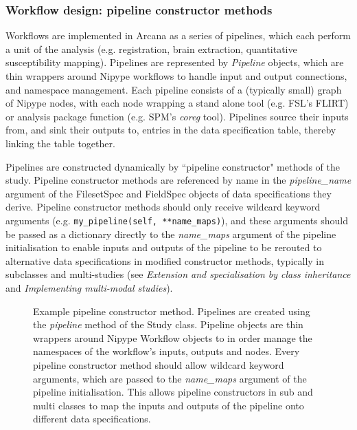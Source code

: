 \documentclass[smallextended]{svjour3}       %
\begin{document}
\subsubsection*{Workflow design: pipeline constructor methods}
\label{sec:pipeline-constructors}

Workflows are implemented in Arcana as a series of pipelines, which
each perform a unit of the analysis (e.g. registration, brain
extraction, quantitative susceptibility mapping). Pipelines are represented by \emph{Pipeline} objects,
which are thin wrappers around Nipype workflows to handle input and output
connections, and namespace management. Each pipeline consists of a
(typically small) graph of Nipype nodes, with each node wrapping a stand alone tool
(e.g. FSL's FLIRT) or analysis package function (e.g. SPM's \emph{coreg}
tool). Pipelines source their inputs from, and sink their outputs to, entries
in the data specification table, thereby linking the table together.

Pipelines are constructed dynamically by ``pipeline constructor" methods
of the study. Pipeline constructor methods are referenced by name in the \emph{pipeline\_name}
argument of the FilesetSpec and FieldSpec objects of data specifications
they derive. Pipeline constructor methods should only receive wildcard keyword
arguments (e.g. \lstinline{my_pipeline(self, **name_maps)}), and these arguments
should be passed as a dictionary directly to the \emph{name\_maps} argument
of the pipeline initialisation to enable inputs and outputs of the
pipeline to be rerouted to alternative data specifications in modified constructor
methods, typically in subclasses and multi-studies (see
\emph{Extension and specialisation by class inheritance} and \emph{Implementing multi-modal studies}).

\begin{figure}

\caption{Example pipeline constructor method. Pipelines are
created using the \emph{pipeline} method of the Study class.
Pipeline objects are thin wrappers around Nipype Workflow objects to
in order manage the namespaces of the workflow's inputs, outputs and nodes. Every
pipeline constructor method should allow wildcard keyword arguments,
which are passed to the \emph{name\_maps} argument of the pipeline
initialisation. This allows pipeline constructors in sub and multi classes to map the
inputs and outputs of the pipeline onto different data specifications.}
\label{fig:pipeline_constructor}
\end{figure}
\end{document}
